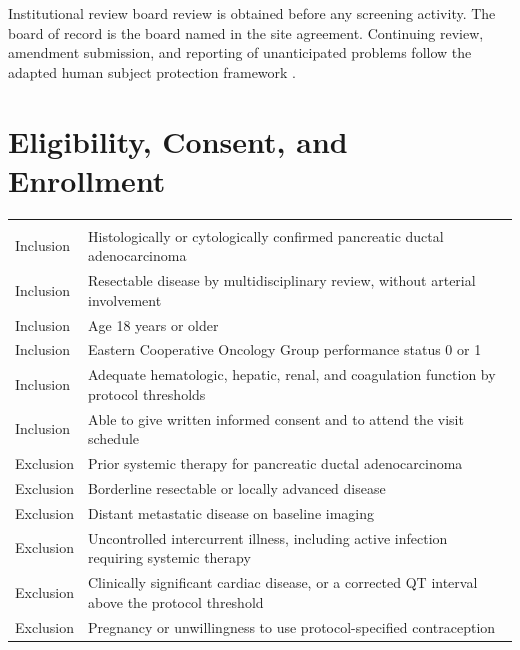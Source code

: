 Institutional review board review is obtained before any screening activity. The
board of record is the board named in the site agreement. Continuing review,
amendment submission, and reporting of unanticipated problems follow the adapted
human subject protection framework \cite{cfr50adapt,cfr50,cfr45part46}.

\section{Eligibility, Consent, and Enrollment}

\begin{mvltable}
\begin{xltabular}{\textwidth}{>{\raggedright\arraybackslash}p{2.0cm} >{\raggedright\arraybackslash}X}
\headrow {} & \\
\midrule
\endfirsthead
\headrow {} & \\
\midrule
\endhead
Inclusion & Histologically or cytologically confirmed pancreatic ductal adenocarcinoma \\
Inclusion & Resectable disease by multidisciplinary review, without arterial involvement \\
Inclusion & Age 18 years or older \\
Inclusion & Eastern Cooperative Oncology Group performance status 0 or 1 \\
Inclusion & Adequate hematologic, hepatic, renal, and coagulation function by protocol thresholds \\
Inclusion & Able to give written informed consent and to attend the visit schedule \\
Exclusion & Prior systemic therapy for pancreatic ductal adenocarcinoma \\
Exclusion & Borderline resectable or locally advanced disease \\
Exclusion & Distant metastatic disease on baseline imaging \\
Exclusion & Uncontrolled intercurrent illness, including active infection requiring systemic therapy \\
Exclusion & Clinically significant cardiac disease, or a corrected QT interval above the protocol threshold \\
Exclusion & Pregnancy or unwillingness to use protocol-specified contraception \\
\end{xltabular}
\end{mvltable}

